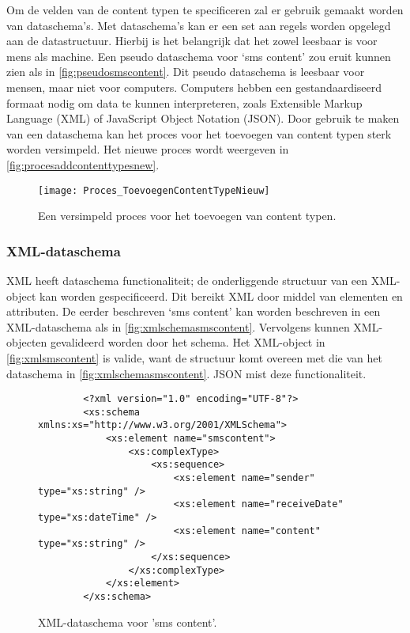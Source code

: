 \pagebreak
\noindent Om de velden van de content typen te specificeren zal er gebruik gemaakt worden van dataschema’s. Met dataschema’s kan er een set aan regels worden opgelegd aan de datastructuur. Hierbij is het belangrijk dat het zowel leesbaar is voor mens als machine. Een pseudo dataschema voor ‘sms content’ zou eruit kunnen zien als in \autoref{fig:pseudosmscontent}.
Dit pseudo dataschema is leesbaar voor mensen, maar niet voor computers. Computers hebben een gestandaardiseerd formaat nodig om data te kunnen interpreteren, zoals Extensible Markup Language (XML) of JavaScript Object Notation (JSON).
Door gebruik te maken van een dataschema kan het proces voor het toevoegen van content typen sterk worden versimpeld. Het nieuwe proces wordt weergeven in \autoref{fig:procesaddcontenttypesnew}.

\begin{figure}[htb]
    \texttt{[image: Proces\_ToevoegenContentTypeNieuw]}
    \caption{Een versimpeld proces voor het toevoegen van content typen.}
    \label{fig:procesaddcontenttypesnew}
    \centering
\end{figure}

\subsubsection{XML-dataschema}
XML heeft dataschema functionaliteit; de onderliggende structuur van een XML-object kan worden gespecificeerd. Dit bereikt XML door middel van elementen en attributen. De eerder beschreven ‘sms content’ kan worden beschreven in een XML-dataschema als in \autoref{fig:xmlschemasmscontent}. Vervolgens kunnen XML-objecten gevalideerd worden door het schema. Het XML-object in \autoref{fig:xmlsmscontent} is valide, want de structuur komt overeen met die van het dataschema in \autoref{fig:xmlschemasmscontent}. JSON mist deze functionaliteit.

\begin{figure}[htb]
    \centering
    \begin{lstlisting}
        <?xml version="1.0" encoding="UTF-8"?>
        <xs:schema xmlns:xs="http://www.w3.org/2001/XMLSchema">
            <xs:element name="smscontent">
                <xs:complexType>
                    <xs:sequence>
                        <xs:element name="sender" type="xs:string" />
                        <xs:element name="receiveDate" type="xs:dateTime" />
                        <xs:element name="content" type="xs:string" />
                    </xs:sequence>
                </xs:complexType>
            </xs:element>
        </xs:schema>                
    \end{lstlisting}
    \caption{XML-dataschema voor 'sms content'.}
    \label{fig:xmlschemasmscontent}
\end{figure}

